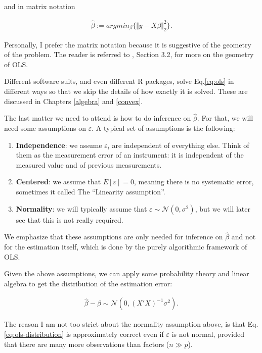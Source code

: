 \documentclass[]{book}
\providecommand{\tightlist}{%
  \setlength{\itemsep}{0pt}\setlength{\parskip}{0pt}}
\theoremstyle{definition}
\theoremstyle{definition}
\theoremstyle{definition}
\theoremstyle{remark}
\let\BeginKnitrBlock\begin \let\EndKnitrBlock\end
\begin{document}
and in matrix notation

\begin{align}
  \hat \beta:= argmin_\beta \{ \Vert y-X\beta \Vert^2_2 \}.
  \label{eq:ols-matrix}
\end{align}

\BeginKnitrBlock{remark}
{}Personally, I prefer the matrix notation
because it is suggestive of the geometry of the problem. The reader is
referred to \citet{friedman2001elements}, Section 3.2, for more on the
geometry of OLS.
\EndKnitrBlock{remark}

Different software suits, and even different R packages, solve
Eq.\eqref{eq:ols} in different ways so that we skip the details of how
exactly it is solved. These are discussed in Chapters \ref{algebra} and
\ref{convex}.

The last matter we need to attend is how to do inference on
\(\hat \beta\). For that, we will need some assumptions on
\(\varepsilon\). A typical set of assumptions is the following:

\begin{enumerate}
\def\labelenumi{\arabic{enumi}.}
\tightlist
\item
  \textbf{Independence}: we assume \(\varepsilon_i\) are independent of
  everything else. Think of them as the measurement error of an
  instrument: it is independent of the measured value and of previous
  measurements.
\item
  \textbf{Centered}: we assume that \(E[\varepsilon]=0\), meaning there
  is no systematic error, sometimes it called The ``Linearity
  assumption''.
\item
  \textbf{Normality}: we will typically assume that
  \(\varepsilon \sim \mathcal{N}(0,\sigma^2)\), but we will later see
  that this is not really required.
\end{enumerate}

We emphasize that these assumptions are only needed for inference on
\(\hat \beta\) and not for the estimation itself, which is done by the
purely algorithmic framework of OLS.

Given the above assumptions, we can apply some probability theory and
linear algebra to get the distribution of the estimation error:

\begin{align}
  \hat \beta - \beta \sim \mathcal{N}(0, (X'X)^{-1} \sigma^2).
  \label{eq:ols-distribution}
\end{align}

The reason I am not too strict about the normality assumption above, is
that Eq.\eqref{eq:ols-distribution} is approximately correct even if
\(\varepsilon\) is not normal, provided that there are many more
observations than factors (\(n \gg p\)).
\end{document}
